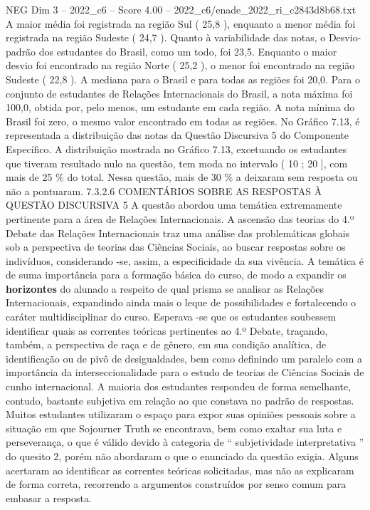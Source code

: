 \begin{textsample}{NEG Dim 3 – 2022\_c6 – Score 4.00 – 2022\_c6/enade\_2022\_ri\_c2843d8b68.txt}
A maior média foi registrada na região Sul ( 25,8 ), enquanto a menor média foi registrada na região Sudeste ( 24,7 ).
Quanto à variabilidade das notas, o Desvio-padrão dos estudantes do Brasil, como um todo, foi 23,5.
Enquanto o maior desvio foi encontrado na região Norte ( 25,2 ), o menor foi encontrado na região Sudeste ( 22,8 ).
A mediana para o Brasil e para todas as regiões foi 20,0.
Para o conjunto de estudantes de Relações Internacionais do Brasil, a nota máxima foi 100,0, obtida por, pelo menos, um estudante em cada região.
A nota mínima do Brasil foi zero, o mesmo valor encontrado em todas as regiões.
No Gráfico 7.13, é representada a distribuição das notas da Questão Discursiva 5 do Componente Específico.
A distribuição mostrada no Gráfico 7.13, excetuando os estudantes que tiveram resultado nulo na questão, tem moda no intervalo ( 10 ; 20 ], com mais de 25 \% do total.
Nessa questão, mais de 30 \% a deixaram sem resposta ou não a pontuaram. 7.3.2.6 COMENTÁRIOS SOBRE AS RESPOSTAS À QUESTÃO DISCURSIVA 5 A questão abordou uma temática extremamente pertinente para a área de Relações Internacionais.
A ascensão das teorias do 4.º Debate das Relações Internacionais traz uma análise das problemáticas globais sob a perspectiva de teorias das Ciências Sociais, ao buscar respostas sobre os indivíduos, considerando -se, assim, a especificidade da sua vivência.
A temática é de suma importância para a formação básica do curso, de modo a expandir os \textbf{horizontes} do alunado a respeito de qual prisma se analisar as Relações Internacionais, expandindo ainda mais o leque de possibilidades e fortalecendo o caráter multidisciplinar do curso.
Esperava -se que os estudantes soubessem identificar quais as correntes teóricas pertinentes ao 4.º Debate, traçando, também, a perspectiva de raça e de gênero, em sua condição analítica, de identificação ou de pivô de desigualdades, bem como definindo um paralelo com a importância da interseccionalidade para o estudo de teorias de Ciências Sociais de cunho internacional.
A maioria dos estudantes respondeu de forma semelhante, contudo, bastante subjetiva em relação ao que constava no padrão de respostas.
Muitos estudantes utilizaram o espaço para expor suas opiniões pessoais sobre a situação em que Sojourner Truth se encontrava, bem como exaltar sua luta e perseverança, o que é válido devido à categoria de “ subjetividade interpretativa ” do quesito 2, porém não abordaram o que o enunciado da questão exigia.
Alguns acertaram ao identificar as correntes teóricas solicitadas, mas não as explicaram de forma correta, recorrendo a argumentos construídos por senso comum para embasar a resposta.

\end{textsample}
